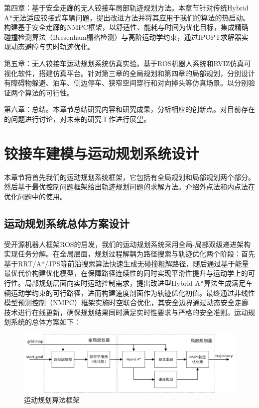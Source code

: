 \documentclass[master,academic]{ysuthesis} %
\begin{document}
	第四章：基于安全走廊的无人铰接车局部轨迹规划方法​。本章节针对传统Hybrid A*无法适应铰接式车辆问题，提出改进方法并将其应用于我们的算法的热启动。构建基于安全走廊的NMPC框架，以舒适性、能耗与时间为优化目标，集成精确碰撞检测算法（Bresenham栅格检测）与高阶运动学约束，通过IPOPT求解器实现动态避障与实时轨迹优化。

	第五章：无人铰接车运动规划系统仿真实验​。基于ROS机器人系统和RVIZ仿真可视化软件，搭建仿真平台。针对第三章的全局规划和第四章的局部规划，分别设计有障碍物躲避、泊车、侧边停车、狭窄空间穿行和对向掉头等仿真场景。以分别验证两个算法的可行性。

	第六章：总结​。本章节总结研究内容和研究成果，分析相应的创新点。对目前存在的问题进行讨论，对未来的研究工作进行展望。

	\chapter{铰接车建模与运动规划系统设计}
	本章节将首先我们的运动规划系统框架，它包括有全局规划和局部规划两个部分。然后基于最优控制问题框架给出轨迹规划问题的求解方法。介绍外点法和内点法在优化问题中的使用。
	\section{运动规划系统总体方案设计}
	受开源机器人框架ROS的启发，我们的运动规划系统采用全局-局部双级递进架构实现任务分解。在全局层面，规划过程解耦为路径搜索与轨迹优化两个阶段：首先基于RRT/A*/JPS等前沿搜索算法快速生成无碰撞粗解路径，随后通过基于能量最优代价构建优化模型，在保障路径连续性的同时实现平滑性提升与运动学上的可行性。局部规划层面向实时运动控制需求，提出改进型Hybrid A*算法生成满足车辆运动学约束的可行路径，进而构建速度剖面作为轨迹优化初值。最终通过非线性模型预测控制（NMPC）框架实施时空联合优化，其安全边界通过动态安全走廊技术进行在线更新，确保规划结果同时满足实时性要求与严格的安全准则。运动规划系统的总体方案如下：
		\begin{figure}[!ht]
			\centering
			\includegraphics[width=1.0\textwidth]{运动规划算法框架.png}
			\caption{运动规划算法框架}
			\label{fig:运动规划算法框架}
		\end{figure}
\end{document}
